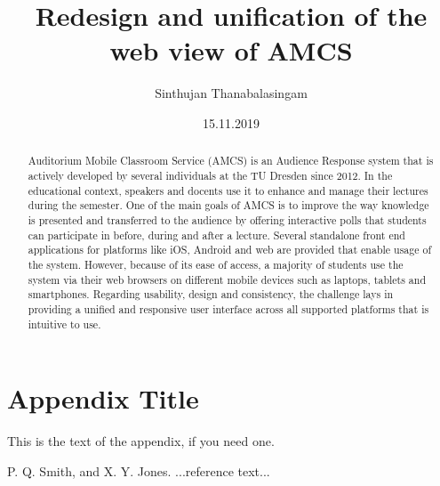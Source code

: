 \documentclass[ngerman]{tudscrreprt}
\begin{document}
	\date{15.11.2019}
	\author{Sinthujan Thanabalasingam}
	\title{Redesign and unification of the web view of AMCS}
	\maketitle
	
\begin{abstract}
	
Auditorium Mobile Classroom Service (AMCS) is an Audience Response system that is actively developed by several individuals at the TU Dresden since 2012. In the educational context, speakers and docents use it to enhance and manage their lectures during the semester. One of the main goals of AMCS is to improve the way knowledge is presented and transferred to the audience by offering interactive polls that students can participate in before, during and after a lecture.
Several standalone front end applications for platforms like iOS, Android and web are provided that enable usage of the system. However, because of its ease of access, a majority of students use the system via their web browsers on different mobile devices such as laptops, tablets and smartphones. 
Regarding usability, design and consistency, the challenge lays in providing a unified and responsive user interface across all supported platforms that is intuitive to use.
	
\end{abstract}









\appendix
\section{Appendix Title}

This is the text of the appendix, if you need one.






\begin{thebibliography}{}
	
	P. Q. Smith, and X. Y. Jones. ...reference text...
	
\end{thebibliography}
\end{document}
